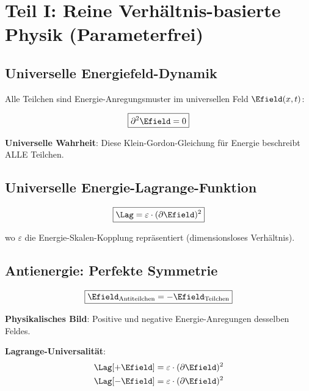 	\section{Teil I: Reine Verhältnis-basierte Physik (Parameterfrei)}
	
	\subsection{Universelle Energiefeld-Dynamik}
	
	Alle Teilchen sind Energie-Anregungsmuster im universellen Feld $\Efield(x,t)$:
	
	\begin{equation}
		\boxed{\partial^2 \Efield = 0}
		\label{eq:universal_field_equation}
	\end{equation}
	
	\textbf{Universelle Wahrheit}: Diese Klein-Gordon-Gleichung für Energie beschreibt ALLE Teilchen.
	
	\subsection{Universelle Energie-Lagrange-Funktion}
	
	\begin{equation}
		\boxed{\Lag = \varepsilon \cdot (\partial \Efield)^2}
		\label{eq:universal_lagrangian}
	\end{equation}
	
	wo $\varepsilon$ die Energie-Skalen-Kopplung repräsentiert (dimensionsloses Verhältnis).
	
	\subsection{Antienergie: Perfekte Symmetrie}
	
	\begin{equation}
		\boxed{\Efield_{\text{Antiteilchen}} = -\Efield_{\text{Teilchen}}}
		\label{eq:energy_antisymmetry}
	\end{equation}
	
	\textbf{Physikalisches Bild}: Positive und negative Energie-Anregungen desselben Feldes.
	
	\textbf{Lagrange-Universalität}:
	\begin{align}
		\Lag[+\Efield] &= \varepsilon \cdot (\partial \Efield)^2 \\
		\Lag[-\Efield] &= \varepsilon \cdot (\partial \Efield)^2
	\end{align}
	
